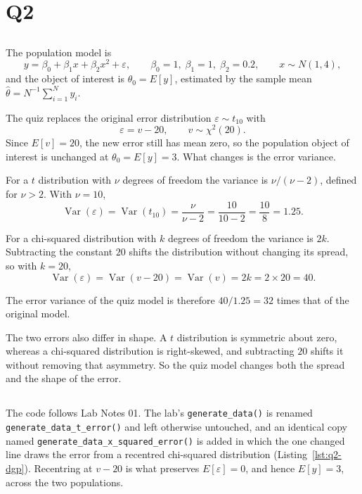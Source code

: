 \documentclass[11pt]{article}
\newcommand{\code}[1]{\texttt{#1}}
\begin{document}
\section{Q2}
\label{sec:q2}

\subsection{}

The population model is
\[
y = \beta_0 + \beta_1 x + \beta_2 x^2 + \varepsilon,
\qquad
\beta_0 = 1,\; \beta_1 = 1,\; \beta_2 = 0.2,
\qquad
x \sim N(1, 4),
\]
and the object of interest is $\theta_0 = E[y]$, estimated by the sample mean
$\hat\theta = N^{-1}\sum_{i=1}^{N} y_i$.

The quiz replaces the original error distribution $\varepsilon \sim t_{10}$ with
\[
\varepsilon = v - 20, \qquad v \sim \chi^2(20).
\]
Since $E[v] = 20$, the new error still has mean zero, so the population object
of interest is unchanged at $\theta_0 = E[y] = 3$. What changes is the error
variance.

For a $t$ distribution with $\nu$ degrees of freedom the variance is
$\nu / (\nu - 2)$, defined for $\nu > 2$. With $\nu = 10$,
\[
\operatorname{Var}(\varepsilon) = \operatorname{Var}(t_{10})
 = \frac{\nu}{\nu - 2} = \frac{10}{10 - 2} = \frac{10}{8} = 1.25 .
\]

For a chi-squared distribution with $k$ degrees of freedom the variance is
$2k$. Subtracting the constant $20$ shifts the distribution without changing
its spread, so with $k = 20$,
\[
\operatorname{Var}(\varepsilon) = \operatorname{Var}(v - 20)
 = \operatorname{Var}(v) = 2k = 2 \times 20 = 40 .
\]

The error variance of the quiz model is therefore $40 / 1.25 = 32$ times that
of the original model.

The two errors also differ in shape. A $t$ distribution is symmetric about
zero, whereas a chi-squared distribution is right-skewed, and subtracting $20$
shifts it without removing that asymmetry. So the quiz model changes both the
spread and the shape of the error.

\subsection{}

The code follows Lab Notes 01. The lab's \code{generate\_data()} is renamed
\code{generate\_data\_t\_error()} and left otherwise untouched, and an identical
copy named \code{generate\_data\_x\_squared\_error()} is added in which the one
changed line draws the error from a recentred chi-squared distribution
(Listing~\ref{lst:q2-dgp}). Recentring at $v - 20$ is what preserves
$E[\varepsilon] = 0$, and hence $E[y] = 3$, across the two populations.
\end{document}
